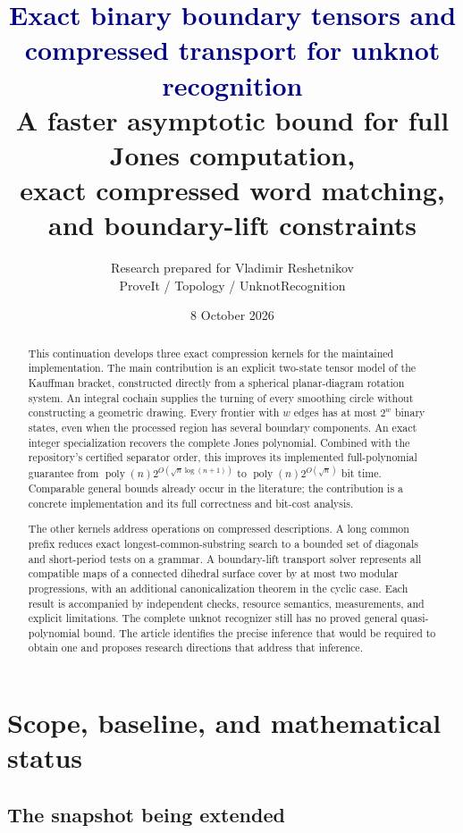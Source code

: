 \documentclass[11pt]{article}
\title{\textcolor{navy}{Exact binary boundary tensors and\\compressed transport for unknot recognition}\\[6pt]
\large A faster asymptotic bound for full Jones computation,\\
exact compressed word matching, and boundary-lift constraints}
\author{Research prepared for Vladimir Reshetnikov\\
\small ProveIt / Topology / UnknotRecognition}
\date{8 October 2026}
\theoremstyle{definition}
\theoremstyle{remark}
\newcommand{\poly}{\operatorname{poly}}
\newcommand{\code}[1]{\texttt{\detokenize{#1}}}
\begin{document}
\maketitle
\begin{abstract}
This continuation develops three exact compression kernels for the maintained
\code{fastunknot} implementation. The main contribution is an explicit
two-state tensor model of the Kauffman bracket, constructed directly from a
spherical planar-diagram rotation system. An integral cochain supplies the
turning of every smoothing circle without constructing a geometric drawing.
Every frontier with $w$ edges has at most $2^w$ binary states, even when the
processed region has several boundary components. An exact integer
specialization recovers the complete Jones polynomial. Combined with the
repository's certified separator order, this improves its implemented
full-polynomial guarantee from
$\poly(n)2^{O(\sqrt n\log(n+1))}$ to
$\poly(n)2^{O(\sqrt n)}$ bit time. Comparable general bounds already occur in
the literature; the contribution is a concrete implementation and its full
correctness and bit-cost analysis.

The other kernels address operations on compressed descriptions. A long
common prefix reduces exact longest-common-substring search to a bounded set
of diagonals and short-period tests on a grammar. A boundary-lift transport
solver represents all compatible maps of a connected dihedral surface cover
by at most two modular progressions, with an additional canonicalization
theorem in the cyclic case. Each result is accompanied by independent checks,
resource semantics, measurements, and explicit limitations. The complete
unknot recognizer still has no proved general quasi-polynomial bound. The
article identifies the precise inference that would be required to obtain
one and proposes research directions that address that inference.
\end{abstract}

\clearpage
\tableofcontents
\clearpage
\section{Scope, baseline, and mathematical status}
\label{sec:overview}

\subsection{The snapshot being extended}
\end{document}
